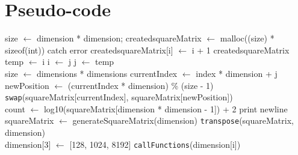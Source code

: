 \documentclass[10pt,twocolumn]{witseiepaper}
\begin{document}
\newpage
\onecolumn
{}
\setcounter{page}{1}
\begin{appendix} \label{sec:appendix}
	
\section{Pseudo-code}

\begin{algorithm}[h!]
	\begin{algorithmic}
		
		\State size $\leftarrow$ dimension * dimension;
		\State created\textunderscore squareMatrix $\leftarrow$ malloc((size) * sizeof(int))
		\State catch error
		\EndIf
		\State created\textunderscore squareMatrix[i] $\leftarrow$ i + 1
		\EndFor
		\State \Return created\textunderscore squareMatrix
		\EndFunction \\
		
		\State temp $\leftarrow$ i
		\State i $\leftarrow$ j
		\State j $\leftarrow$ temp
		\EndFunction \\
		
		\State size $\leftarrow$ dimensions * dimensions
		\State currentIndex $\leftarrow$ index * dimension + j
		\State newPosition $\leftarrow$ (currentIndex * dimension) \% (size - 1)
		\EndFor
		\EndFor
		\State \verb|swap|(squareMatrix[currentIndex], squareMatrix[newPosition])
		\EndFunction \\
		
		\State count $\leftarrow$ log10(squareMatrix[dimension * dimension - 1]) + 2
		\State print newline
		\EndIf
		\EndFor
		\EndFunction \\
		
		\State squareMatrix $\leftarrow$ generateSquareMatrix(dimension)
		\State \verb|transpose|(squareMatrix, dimension)
		\EndFunction \\
		
		\State dimension[3] $\leftarrow$ [128, 1024, 8192]
		\State \verb|callFunctions|(dimension[i])
		\EndFor
		\State {}
		\EndFunction
		

\end{algorithmic}
\end{algorithm}
\end{appendix}
\end{document}
